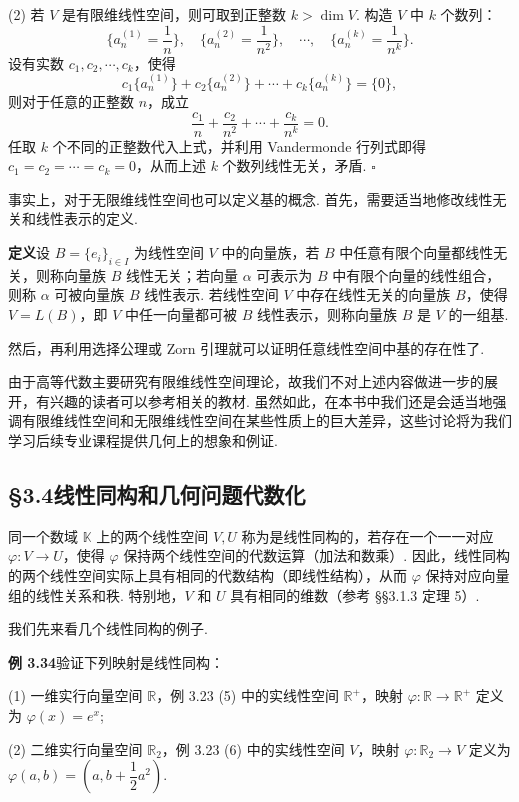 \documentclass[UTF8, 12pt, fontset=fandol, oneside]{ctexart}
\begin{document}
(2) 若 $V$ 是有限维线性空间，则可取到正整数 $k>\dim V$. 构造 $V$ 中 $k$ 个数列：
\[
\{a_n^{(1)}=\frac{1}{n}\},\quad \{a_n^{(2)}=\frac{1}{n^2}\},\quad \cdots,\quad \{a_n^{(k)}=\frac{1}{n^k}\}.
\]
设有实数 $c_1,c_2,\cdots,c_k$，使得
\[
c_1\{a_n^{(1)}\}+c_2\{a_n^{(2)}\}+\cdots+c_k\{a_n^{(k)}\}=\{0\},
\]
则对于任意的正整数 $n$，成立
\[
\frac{c_1}{n}+\frac{c_2}{n^2}+\cdots+\frac{c_k}{n^k}=0.
\]
任取 $k$ 个不同的正整数代入上式，并利用 Vandermonde 行列式即得 $c_1=c_2=\cdots=c_k=0$，从而上述 $k$ 个数列线性无关，矛盾. $\square$

事实上，对于无限维线性空间也可以定义基的概念. 首先，需要适当地修改线性无关和线性表示的定义.

\noindent\textbf{定义}\quad 设 $B=\{e_i\}_{i\in I}$ 为线性空间 $V$ 中的向量族，若 $B$ 中任意有限个向量都线性无关，则称向量族 $B$ 线性无关；若向量 $\alpha$ 可表示为 $B$ 中有限个向量的线性组合，则称 $\alpha$ 可被向量族 $B$ 线性表示. 若线性空间 $V$ 中存在线性无关的向量族 $B$，使得 $V=L(B)$，即 $V$ 中任一向量都可被 $B$ 线性表示，则称向量族 $B$ 是 $V$ 的一组基.

然后，再利用选择公理或 Zorn 引理就可以证明任意线性空间中基的存在性了.

由于高等代数主要研究有限维线性空间理论，故我们不对上述内容做进一步的展开，有兴趣的读者可以参考相关的教材. 虽然如此，在本书中我们还是会适当地强调有限维线性空间和无限维线性空间在某些性质上的巨大差异，这些讨论将为我们学习后续专业课程提供几何上的想象和例证.

\subsection*{§3.4\quad 线性同构和几何问题代数化}

同一个数域 $\mathbb{K}$ 上的两个线性空间 $V,U$ 称为是线性同构的，若存在一个一一对应 $\varphi:V\to U$，使得 $\varphi$ 保持两个线性空间的代数运算（加法和数乘）. 因此，线性同构的两个线性空间实际上具有相同的代数结构（即线性结构），从而 $\varphi$ 保持对应向量组的线性关系和秩. 特别地，$V$ 和 $U$ 具有相同的维数（参考 §§3.1.3 定理 5）.

我们先来看几个线性同构的例子.

\noindent\textbf{例 3.34}\quad 验证下列映射是线性同构：

(1) 一维实行向量空间 $\mathbb{R}$，例 3.23 (5) 中的实线性空间 $\mathbb{R}^+$，映射 $\varphi:\mathbb{R}\to\mathbb{R}^+$ 定义为 $\varphi(x)=e^x$;

(2) 二维实行向量空间 $\mathbb{R}_2$，例 3.23 (6) 中的实线性空间 $V$，映射 $\varphi:\mathbb{R}_2\to V$ 定义为 $\varphi(a,b)=(a,b+\dfrac{1}{2}a^2)$.
\end{document}
